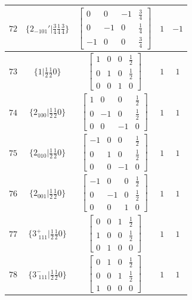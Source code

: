 \documentclass[fleqn,8pt]{jsarticle}
\begin{document}
\begin{longtable}{ccccc}
$ 72 $ & $ \{2{}_{-101}{}'|\frac{3}{4} \frac{1}{4} \frac{3}{4}\} $ & $ \begin{bmatrix} 0 & 0 & -1 & \frac{3}{4} \\ 0 & -1 & 0 & \frac{1}{4} \\ -1 & 0 & 0 & \frac{3}{4} \end{bmatrix} $ & $ 1 $ & $ -1 $ \\ \hline
$ 73 $ & $ \{1|\frac{1}{2} \frac{1}{2} 0\} $ & $ \begin{bmatrix} 1 & 0 & 0 & \frac{1}{2} \\ 0 & 1 & 0 & \frac{1}{2} \\ 0 & 0 & 1 & 0 \end{bmatrix} $ & $ 1 $ & $ 1 $ \\ \hline
$ 74 $ & $ \{2{}_{100}|\frac{1}{2} \frac{1}{2} 0\} $ & $ \begin{bmatrix} 1 & 0 & 0 & \frac{1}{2} \\ 0 & -1 & 0 & \frac{1}{2} \\ 0 & 0 & -1 & 0 \end{bmatrix} $ & $ 1 $ & $ 1 $ \\ \hline
$ 75 $ & $ \{2{}_{010}|\frac{1}{2} \frac{1}{2} 0\} $ & $ \begin{bmatrix} -1 & 0 & 0 & \frac{1}{2} \\ 0 & 1 & 0 & \frac{1}{2} \\ 0 & 0 & -1 & 0 \end{bmatrix} $ & $ 1 $ & $ 1 $ \\ \hline
$ 76 $ & $ \{2{}_{001}|\frac{1}{2} \frac{1}{2} 0\} $ & $ \begin{bmatrix} -1 & 0 & 0 & \frac{1}{2} \\ 0 & -1 & 0 & \frac{1}{2} \\ 0 & 0 & 1 & 0 \end{bmatrix} $ & $ 1 $ & $ 1 $ \\ \hline
$ 77 $ & $ \{3^{+}_{\,\,111}|\frac{1}{2} \frac{1}{2} 0\} $ & $ \begin{bmatrix} 0 & 0 & 1 & \frac{1}{2} \\ 1 & 0 & 0 & \frac{1}{2} \\ 0 & 1 & 0 & 0 \end{bmatrix} $ & $ 1 $ & $ 1 $ \\ \hline
$ 78 $ & $ \{3^{-}_{\,\,111}|\frac{1}{2} \frac{1}{2} 0\} $ & $ \begin{bmatrix} 0 & 1 & 0 & \frac{1}{2} \\ 0 & 0 & 1 & \frac{1}{2} \\ 1 & 0 & 0 & 0 \end{bmatrix} $ & $ 1 $ & $ 1 $ \\ \hline

\end{longtable}
\end{document}
